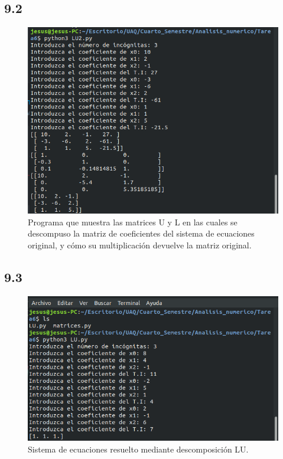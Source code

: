 \documentclass[12pt,oneside,FLEQN]{report}
\begin{document}
{	\subsection{9.2}
		
		\begin{figure}[!h]
			\centering
			\includegraphics[scale=0.5]{102.png}
			\caption{Programa que muestra las matrices U y L en las cuales se descompuso la matriz de coeficientes del sistema de ecuaciones original, y cómo su multiplicación devuelve la matriz original.}
		\end{figure}
	\subsection{9.3}
		
		\begin{figure}[!h]
			\centering
			\includegraphics[scale=0.5]{103.png}
			\caption{Sistema de ecuaciones resuelto mediante descomposición LU.}
		\end{figure}
}
\end{document}
